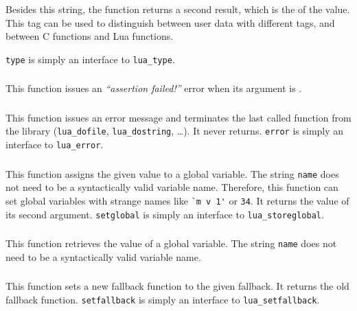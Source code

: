 Besides this string, the function returns a second result,
which is the  of the value.
This tag can be used to distinguish between user
data with different tags,
and between C functions and Lua functions.

\verb|type| is simply an interface to \verb|lua_type|.

\subsubsection*{}
This function issues an {\em ``assertion failed!''} error
when its argument is \nil.

\subsubsection*{}\label{pdf-error}
This function issues an error message and terminates
the last called function from the library
(\verb'lua_dofile', \verb'lua_dostring', \ldots).
It never returns.
\verb|error| is simply an interface to \verb|lua_error|.

\subsubsection*{}
This function assigns the given value to a global variable.
The string \verb'name' does not need to be a syntactically valid variable name.
Therefore, this function can set global variables with strange names like
\verb|`m v 1'| or \verb'34'.
It returns the value of its second argument.
\verb|setglobal| is simply an interface to \verb|lua_storeglobal|.

\subsubsection*{}
This function retrieves the value of a global variable.
The string \verb'name' does not need to be a syntactically valid variable name.

\subsubsection*{}
This function sets a new fallback function to the given fallback.
It returns the old fallback function.
\verb|setfallback| is simply an interface to \verb|lua_setfallback|.

